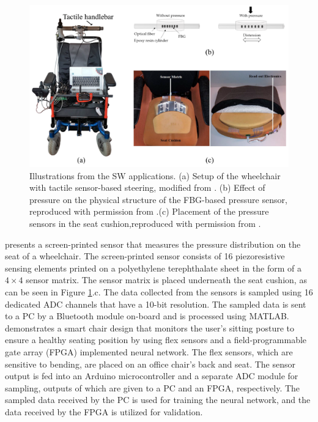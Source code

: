 \begin{figure}[t!]
    \centering
    \includegraphics[scale=0.95]{Figure/Seating and Mobility Aids/Smart_chair.PNG}
    \caption{Illustrations from the SW applications. (a)  Setup of the wheelchair with tactile sensor-based steering, modified from \parencite{trujillo-leon_tactile_2018}. (b)  Effect of pressure on the physical structure of the FBG-based pressure sensor, reproduced with permission from \parencite{tavares_wheelchair_2020}.(c) Placement of the pressure sensors in the seat cushion,reproduced with permission from \parencite{ahmad_screen-printed_2019}. }
    \label{fig:smart_chair}
\end{figure}

\textcite{ahmad_screen-printed_2019} presents a screen-printed sensor that measures the pressure distribution on the seat of a wheelchair. The screen-printed sensor consists of 16 piezoresistive sensing elements printed on a polyethylene terephthalate sheet in the form of a $4\times4$ sensor matrix. The sensor matrix is placed underneath the seat cushion, as can be seen in Figure \ref{fig:smart_chair}.c. The data collected from the sensors is sampled using 16 dedicated ADC channels that have a 10-bit resolution. The sampled data is sent to a PC by a Bluetooth module on-board and is processed using MATLAB. \textcite{hu_smart_2020} demonstrates a smart chair design that monitors the user's sitting posture to ensure a healthy seating position by using flex sensors and a field-programmable gate array (FPGA) implemented neural network. The flex sensors, which are sensitive to bending, are placed on an office chair's back and seat. The sensor output is fed into an Arduino microcontroller and a separate ADC module for sampling, outputs of which are given to a PC and an FPGA, respectively. The sampled data received by the PC is used for training the neural network, and the data received by the FPGA is utilized for validation.

